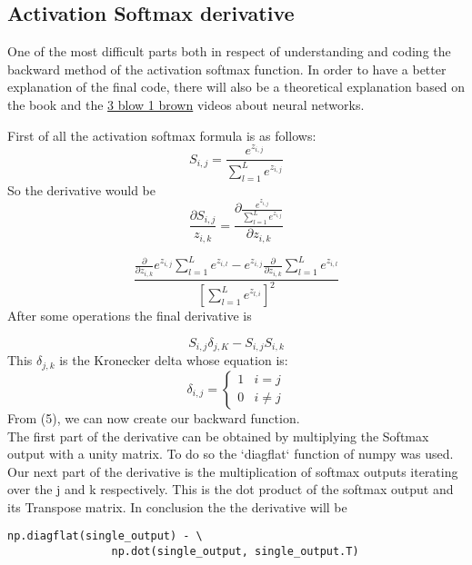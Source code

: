 \documentclass{article}
\begin{document}
\subsection{Activation Softmax derivative}
One of the most difficult parts both in respect of understanding and coding the backward method of the activation softmax function. In order to have a better explanation of the final code, there will also be a theoretical explanation based on the \cite{nnfs} book and the 
\href{https://gcps.desire2learn.com/d2l/lor/viewer/viewfile.d2lfile/6605/7951/global_latitude_longitude.gif}{3 blow 1 brown} videos about neural networks.

First of all the activation softmax formula is as follows: 
\\ 
\begin{equation}
S_{i,j} = \frac{e^{z_{i,j}}}{\sum_{l=1}^L e^{z_{i,j}}}
\end{equation}
So the derivative would be 
\begin{equation}
\frac{\partial S_{i,j}}{z_{i,k}} =\frac{\partial{ \frac{e^{z_{i,j}}}{\sum_{l=1}^L e^{z_{i,j}}}}}{\partial z_{i,k}}
\end{equation}
 
\begin{equation}
\frac{\frac{\partial}{\partial z_{i,k}} e^{z_{i,j}} \sum_{l=1}^{L} e^{z_{i,l}} - e^{z_{i,j}}  \frac{\partial}{\partial z_{i,k}} \sum_{l=1}^{L} e^{z_{i,l}}}{[{\sum_{l=1}^L e^{z_{l,i}}}]^2}
\end{equation}
After some operations the final derivative is 

\begin{equation}
S_{i,j} \delta_{j,K}  - S_{i,j} S_{i,k}
\end{equation}
This $ \delta_{j,k}$ is the Kronecker delta whose equation is: 
\begin{equation}
\delta_{i,j} = \left\{
	\begin{array}{ll}
		1  & i = j \\
		0 & i \neq j
	\end{array}
\end{equation}
From (5), we can now create our backward function. \\
The first part of the derivative can be obtained by multiplying the Softmax output with a unity matrix. 
To do so the `diagflat` function of numpy was used. 
Our next part of the derivative is the multiplication of softmax outputs iterating over the j and k respectively. This is the dot product of the softmax output and its Transpose matrix. In conclusion the the derivative will be 
\begin{lstlisting}
np.diagflat(single_output) - \
                np.dot(single_output, single_output.T)

\end{lstlisting}
\end{document}
